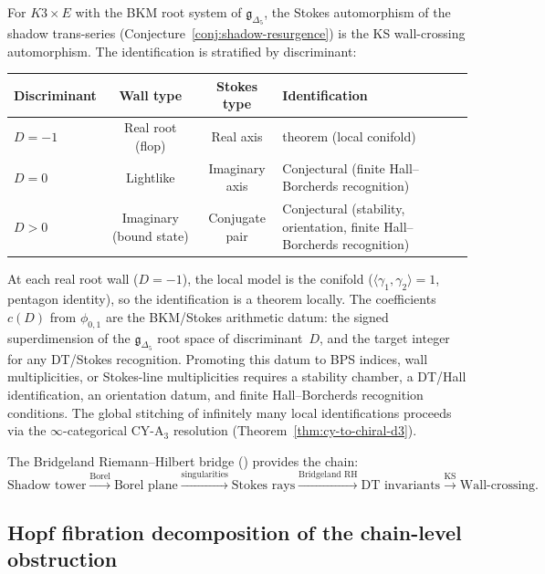 \begin{conjecture}[Stokes automorphism = KS wall-crossing: \texorpdfstring{$K3 \times E$}{K3 x E}]
\label{conj:stokes-ks-k3e}
\ClaimStatusConjectured
For $K3 \times E$ with the BKM root system of $\mathfrak{g}_{\Delta_5}$, the Stokes automorphism of the shadow trans-series \textup{(}Conjecture~\textup{\ref{conj:shadow-resurgence})} is the KS wall-crossing automorphism. The identification is stratified by discriminant:
\begin{center}
\renewcommand{\arraystretch}{1.2}
\begin{tabular}{@{}lccl@{}}
\textbf{Discriminant} & \textbf{Wall type} & \textbf{Stokes type} & \textbf{Identification} \\ \hline
$D = -1$ & Real root (flop) & Real axis & theorem \textup{(}local conifold\textup{)} \\
$D = 0$ & Lightlike & Imaginary axis & Conjectural \textup{(}finite Hall--Borcherds recognition\textup{)} \\
$D > 0$ & Imaginary (bound state) & Conjugate pair & Conjectural \textup{(}stability, orientation, finite Hall--Borcherds recognition\textup{)}
\end{tabular}
\end{center}
At each real root wall ($D = -1$), the local model is the conifold \textup{(}$\langle \gamma_1, \gamma_2 \rangle = 1$, pentagon identity\textup{)}, so the identification is a theorem locally. The coefficients $c(D)$ from $\phi_{0,1}$ are the BKM/Stokes arithmetic datum: the signed superdimension of the $\mathfrak{g}_{\Delta_5}$ root space of discriminant~$D$, and the target integer for any DT/Stokes recognition. Promoting this datum to BPS indices, wall multiplicities, or Stokes-line multiplicities requires a stability chamber, a DT/Hall identification, an orientation datum, and finite Hall--Borcherds recognition conditions. The global stitching of infinitely many local identifications proceeds via the $\infty$-categorical CY-A$_3$ resolution \textup{(}Theorem~\textup{\ref{thm:cy-to-chiral-d3}}\textup{)}.

The Bridgeland Riemann--Hilbert bridge \textup{(}\cite{Bridgeland2019RH}\textup{)} provides the chain:
\[
 \text{Shadow tower} \xrightarrow{\text{Borel}} \text{Borel plane} \xrightarrow{\text{singularities}} \text{Stokes rays} \xrightarrow{\text{Bridgeland RH}} \text{DT invariants} \xrightarrow{\text{KS}} \text{Wall-crossing.}
\]
\end{conjecture}


\subsection{Hopf fibration decomposition of the chain-level obstruction}
\label{subsec:hopf-fibration-decomposition}

